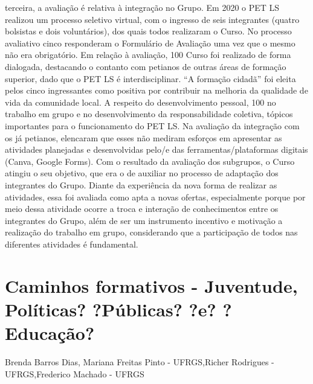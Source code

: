 terceira, a avaliação é relativa à integração no Grupo. Em 2020 o PET LS realizou um processo 
seletivo virtual, com o ingresso de seis integrantes (quatro bolsistas e dois voluntários), dos quais 
todos realizaram o Curso. No processo avaliativo cinco responderam o Formulário de Avaliação 
uma vez que o mesmo não era obrigatório. Em relação à avaliação, 100%
Curso foi realizado de forma dialogada, destacando o contanto com petianos de outras áreas de 
formação superior, dado que o PET LS é interdisciplinar. “A formação cidadã” foi eleita pelos 
cinco ingressantes como positiva por contribuir na melhoria da qualidade de vida da comunidade 
local. A respeito do desenvolvimento pessoal, 100%
no trabalho em grupo e no desenvolvimento da responsabilidade coletiva, tópicos importantes 
para o funcionamento do PET LS. Na avaliação da integração com os já petianos, elencaram que 
esses não mediram esforços em apresentar as atividades planejadas e desenvolvidas pelo/e das 
ferramentas/plataformas digitais (Canva, Google Forms). Com o resultado da avaliação dos 
subgrupos, o Curso atingiu o seu objetivo, que era o de auxiliar no processo de adaptação dos
integrantes do Grupo. Diante da experiência da nova forma de realizar as atividades, essa foi 
avaliada como apta a novas ofertas, especialmente porque por meio dessa atividade ocorre a 
troca e interação de conhecimentos entre os integrantes do Grupo, além de ser um instrumento 
incentivo e motivação a realização do trabalho em grupo, considerando que a participação de 
todos nas diferentes atividades é fundamental.



\section{Caminhos formativos - Juventude, Políticas? ?Públicas? ?e? ?Educação?}

Brenda Barros Dias, Mariana Freitas Pinto - UFRGS,Richer Rodrigues - UFRGS,Frederico Machado - UFRGS


